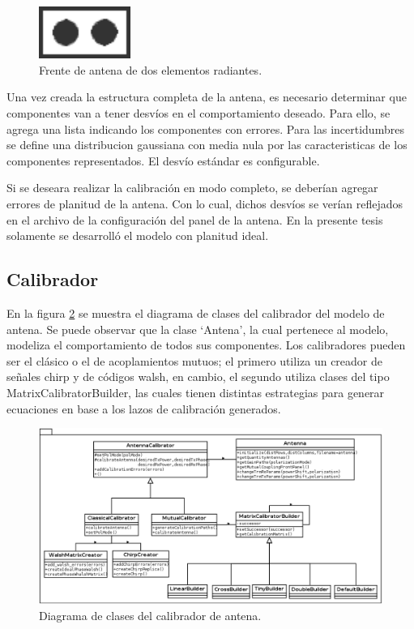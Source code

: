 \begin{figure}
 \centering
 \includegraphics[width=3cm]{gfx/FrontAntenna2.png}
 \caption{Frente de antena de dos elementos radiantes.}
 \label{fig:frontAntenna}
\end{figure}

Una vez creada la estructura completa de la antena, es necesario determinar que componentes van a tener desvíos en el
comportamiento deseado. Para ello, se agrega una lista indicando los componentes con errores. Para las incertidumbres se define
una distribucion gaussiana con media nula por las caracteristicas de los componentes representados. El desvío estándar es 
configurable.

Si se deseara realizar la calibración en modo completo, se deberían agregar errores de planitud de la antena. Con lo cual, 
dichos desvíos se verían reflejados en el archivo de la configuración del panel de la antena. En la presente tesis solamente 
se desarrolló el modelo con planitud ideal.


\subsection{Calibrador}

En la figura \ref{fig:modelPackage} se muestra el diagrama de clases del calibrador del modelo de antena. Se puede observar que
la clase \enquote*{Antena}, la cual pertenece al modelo, modeliza el comportamiento de todos sus componentes. Los calibradores
pueden ser el clásico o el de acoplamientos mutuos; el primero utiliza un creador de señales chirp y de códigos walsh, en
cambio, el segundo utiliza clases del tipo MatrixCalibratorBuilder, las cuales tienen distintas estrategias para generar
ecuaciones en base a los lazos de calibración generados.

\begin{figure}
 \centering
 \includegraphics[width=15cm]{gfx/modelPackage.png}
 \caption{Diagrama de clases del calibrador de antena.}
 \label{fig:modelPackage}
\end{figure}


